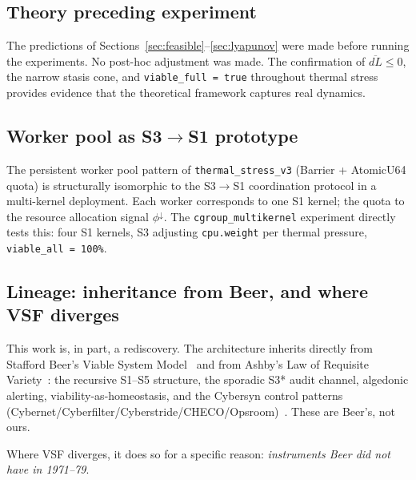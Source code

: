 \documentclass[11pt, a4paper]{article}
\begin{document}
\subsection{Theory preceding experiment}

The predictions of Sections~\ref{sec:feasible}--\ref{sec:lyapunov} were
made before running the experiments.
No post-hoc adjustment was made.
The confirmation of $\overline{dL} \le 0$, the narrow stasis cone,
and \texttt{viable\_full = true} throughout thermal stress provides
evidence that the theoretical framework captures real dynamics.

\subsection{Worker pool as S3$\to$S1 prototype}

The persistent worker pool pattern of \texttt{thermal\_stress\_v3}
(Barrier + AtomicU64 quota) is structurally isomorphic to the S3$\to$S1
coordination protocol in a multi-kernel deployment.
Each worker corresponds to one S1 kernel; the quota to the resource
allocation signal $\phi^\downarrow$.
The \texttt{cgroup\_multikernel} experiment directly tests this:
four S1 kernels, S3 adjusting \texttt{cpu.weight} per thermal pressure,
\texttt{viable\_all = 100\%}.

\subsection{Lineage: inheritance from Beer, and where VSF diverges}
\label{sec:beer_lineage}

This work is, in part, a rediscovery. The architecture inherits directly from
Stafford Beer's Viable System Model~\cite{beer1972brain, beer1979heart} and from
Ashby's Law of Requisite Variety~\cite{ashby1956introduction}: the recursive
S1--S5 structure, the sporadic S3* audit channel, algedonic alerting,
viability-as-homeostasis, and the Cybersyn control patterns
(Cybernet/Cyberfilter/Cyberstride/CHECO/Opsroom)~\cite{medina2011cybernetic}.
These are Beer's, not ours.

Where VSF diverges, it does so for a specific reason: \emph{instruments Beer did
not have in 1971--79}.
\end{document}
